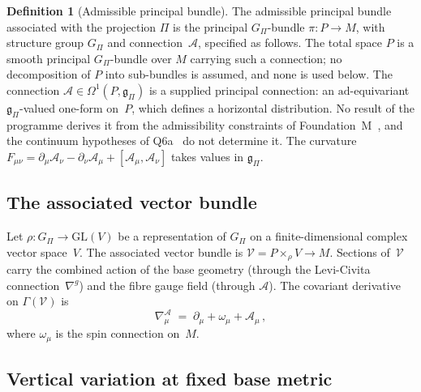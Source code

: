 \documentclass[12pt,a4paper]{article}
\theoremstyle{remark}
\theoremstyle{plain}
\theoremstyle{definition}
\newtheorem{definition}{Definition}
\begin{document}
      \begin{definition}[Admissible principal bundle]
        \label{def:bundle}
        The admissible principal bundle associated with the projection
        $\Pi$ is the principal $G_\Pi$-bundle
        $\pi : P \to M$, with structure group $G_\Pi$ and
        connection~$\mathcal{A}$, specified as follows.
        The total space $P$ is a smooth principal $G_\Pi$-bundle over $M$ carrying such a
        connection; no decomposition of $P$ into sub-bundles is assumed, and none is used
        below.
        The connection $\mathcal{A} \in \Omega^1(P, \mathfrak{g}_\Pi)$
        is a supplied principal connection: an $\mathrm{ad}$-equivariant $\mathfrak{g}_\Pi$-valued
        one-form on~$P$, which defines a horizontal distribution.
        No result of the programme derives it from the admissibility constraints of
        Foundation~M~\cite{Beau2026m}, and the continuum hypotheses of Q6a~\cite{Beau2026q6a} do not
        determine it.
        The curvature $F_{\mu\nu}
        = \partial_\mu \mathcal{A}_\nu
        - \partial_\nu \mathcal{A}_\mu
        + [\mathcal{A}_\mu, \mathcal{A}_\nu]$
        takes values in $\mathfrak{g}_\Pi$.
      \end{definition}

    \subsection{The associated vector bundle}
      \label{subsec:associated}

      Let $\rho : G_\Pi \to \mathrm{GL}(V)$ be a representation of
      $G_\Pi$ on a finite-dimensional complex vector space~$V$.
      The associated vector bundle is
      $\mathcal{V} = P \times_\rho V \to M$.
      Sections of~$\mathcal{V}$ carry the combined action of the base
      geometry (through the Levi-Civita connection~$\nabla^g$) and the
      fibre gauge field (through $\mathcal{A}$).
      The covariant derivative on $\Gamma(\mathcal{V})$ is
      \begin{equation}\label{eq:covariant-derivative}
        \nabla^\mathcal{A}_\mu
        \;=\;
        \partial_\mu
        + \omega_\mu
        + \mathcal{A}_\mu\,,
      \end{equation}
      where $\omega_\mu$ is the spin connection on~$M$.

    \subsection{Vertical variation at fixed base metric}
      \label{subsec:decoupling}
\end{document}
